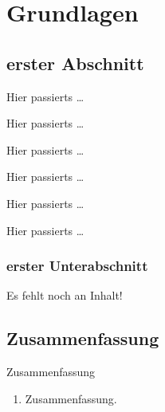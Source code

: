 \chapter{Grundlagen}


\website

\section{erster Abschnitt}

\begin{Frame}{Hier passierts}
  \ldots
\end{Frame}

\begin{Frame}{Hier passierts}
  \ldots
\end{Frame}

\begin{Frame}{Hier passierts}
  \ldots
\end{Frame}

\begin{Frame}{Hier passierts}
  \ldots
\end{Frame}

\begin{Frame}{Hier passierts}
  \ldots
\end{Frame}

\begin{Frame}{Hier passierts}
  \ldots
\end{Frame}

\subsection{erster Unterabschnitt}

\begin{Frame}
  Es fehlt noch an Inhalt!
\end{Frame}

\section*{Zusammenfassung}

\begin{frame}{Zusammenfassung}
  \begin{enumerate}
    \item Zusammenfassung.
  \end{enumerate}
\end{frame}